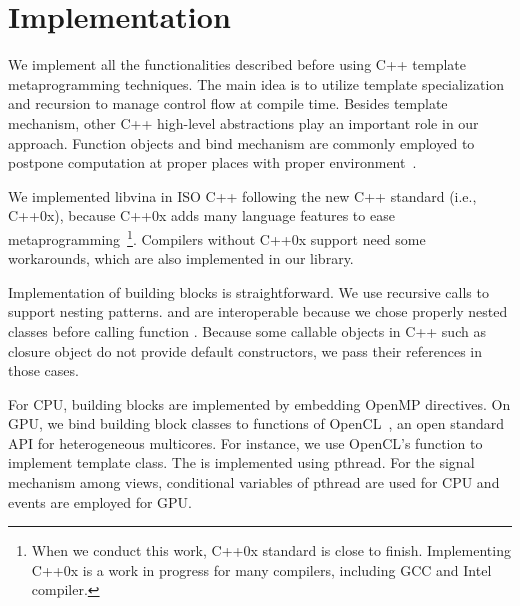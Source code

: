 \section{Implementation}
\label{sec:details}

We implement all the functionalities described before using C++
template metaprogramming techniques.
The main idea is to utilize
template specialization and recursion to manage control flow at
compile time. Besides template mechanism, other C++ high-level
abstractions play an important role in our approach.
Function objects and bind mechanism are commonly employed to postpone computation
at proper places with proper environment~\cite{moderncpp}.

We implemented libvina in ISO C++ following the new C++ standard (i.e., C++0x\cite{c++0x}),
because C++0x adds many language features to ease metaprogramming~\footnote{When
we conduct this work, C++0x standard is close to finish. Implementing C++0x is a work in
progress for many compilers, including GCC and Intel compiler.}. Compilers
without C++0x support need some workarounds, which are also implemented in our
library.

Implementation of building blocks is straightforward. We use recursive calls
to support nesting patterns.  and  are interoperable
because we chose properly nested classes before calling function .
Because some callable objects in C++ such as closure object
do not provide default constructors, we pass their
references in those cases. 

For CPU, building blocks are implemented by embedding OpenMP directives. On GPU, we bind
building block classes to functions of OpenCL~\cite{opencl}, an open standard API
for heterogeneous multicores. For instance, we use OpenCL's  function
to implement  template class. The  is implemented using pthread.
For the signal mechanism among views, conditional variables of pthread are used
for CPU and events are employed for GPU.

